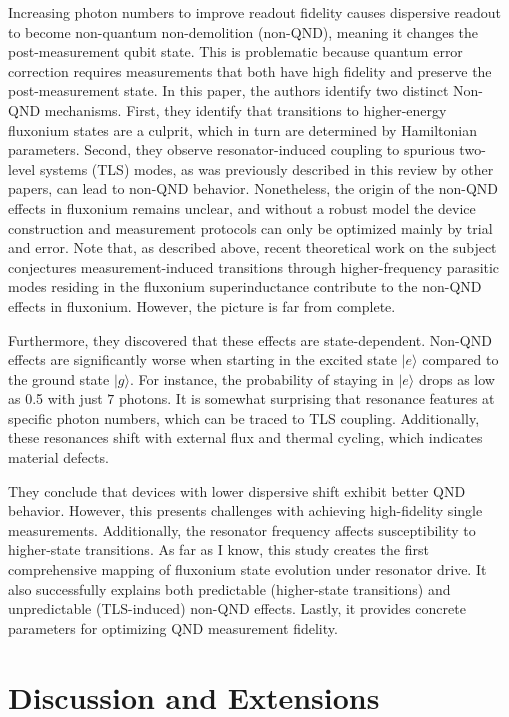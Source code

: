 \documentclass[
 reprint,
 superscriptaddress,
 bibnotes,
 amsmath,
 amssymb,
 aps,
 prb,
 citeautoscript,
 floatfix,
]{revtex4-2}
\begin{document}
Increasing photon numbers to improve readout fidelity causes dispersive readout to become non-quantum non-demolition (non-QND), meaning it changes the post-measurement qubit state. This is problematic because quantum error correction requires measurements that both have high fidelity and preserve the post-measurement state. In this paper, the authors identify two distinct Non-QND mechanisms. First, they identify that transitions to higher-energy fluxonium states are a culprit, which in turn are determined by Hamiltonian parameters. Second, they observe resonator-induced coupling to spurious two-level systems (TLS) modes, as was previously described in this review by other papers, can lead to non-QND behavior. Nonetheless, the origin of the non-QND effects in fluxonium remains unclear, and without a robust model the device construction and measurement protocols can only be optimized mainly by trial and error. Note that, as described above, recent theoretical work on the subject conjectures measurement-induced transitions through higher-frequency parasitic modes residing in the fluxonium superinductance contribute to the non-QND effects in fluxonium. However, the picture is far from complete.

Furthermore, they discovered that these effects are state-dependent. Non-QND effects are significantly worse when starting in the excited state $|e\rangle$ compared to the ground state $|g\rangle$. For instance, the probability of staying in $|e\rangle$ drops as low as 0.5 with just $7$ photons. It is somewhat surprising that resonance features at specific photon numbers, which can be traced to TLS coupling. Additionally, these resonances shift with external flux and thermal cycling, which indicates material defects.

They conclude that devices with lower dispersive shift exhibit better QND behavior. However, this presents challenges with achieving high-fidelity single measurements. Additionally, the resonator frequency affects susceptibility to higher-state transitions. As far as I know, this study creates the first comprehensive mapping of fluxonium state evolution under resonator drive. It also successfully explains both predictable (higher-state transitions) and unpredictable (TLS-induced) non-QND effects. Lastly, it provides concrete parameters for optimizing QND measurement fidelity.


\section{Discussion and Extensions}\label{sec5}
\end{document}
